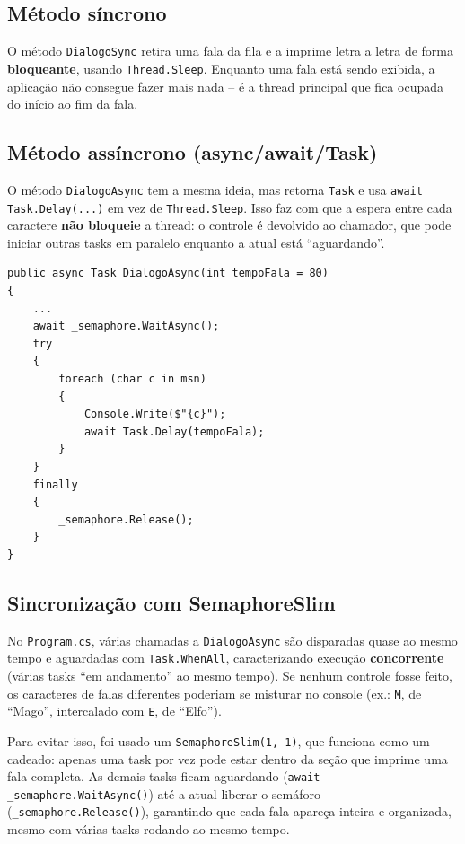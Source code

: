 \documentclass[12pt,a4paper]{article}
\begin{document}
\subsection{Método síncrono}

O método \texttt{DialogoSync} retira uma fala da fila e a imprime letra a letra de
forma \textbf{bloqueante}, usando \texttt{Thread.Sleep}. Enquanto uma fala está sendo
exibida, a aplicação não consegue fazer mais nada -- é a thread principal que fica
ocupada do início ao fim da fala.

\subsection{Método assíncrono (async/await/Task)}

O método \texttt{DialogoAsync} tem a mesma ideia, mas retorna \texttt{Task} e usa
\texttt{await Task.Delay(...)} em vez de \texttt{Thread.Sleep}. Isso faz com que a
espera entre cada caractere \textbf{não bloqueie} a thread: o controle é devolvido
ao chamador, que pode iniciar outras tasks em paralelo enquanto a atual está
``aguardando''.

\begin{lstlisting}
public async Task DialogoAsync(int tempoFala = 80)
{
    ...
    await _semaphore.WaitAsync();
    try
    {
        foreach (char c in msn)
        {
            Console.Write($"{c}");
            await Task.Delay(tempoFala);
        }
    }
    finally
    {
        _semaphore.Release();
    }
}
\end{lstlisting}

\subsection{Sincronização com SemaphoreSlim}

No \texttt{Program.cs}, várias chamadas a \texttt{DialogoAsync} são disparadas quase ao
mesmo tempo e aguardadas com \texttt{Task.WhenAll}, caracterizando execução
\textbf{concorrente} (várias tasks ``em andamento'' ao mesmo tempo). Se nenhum
controle fosse feito, os caracteres de falas diferentes poderiam se misturar no
console (ex.: \texttt{M}, de ``Mago'', intercalado com \texttt{E}, de ``Elfo'').

Para evitar isso, foi usado um \texttt{SemaphoreSlim(1, 1)}, que funciona como um
cadeado: apenas uma task por vez pode estar dentro da seção que imprime uma fala
completa. As demais tasks ficam aguardando (\texttt{await \_semaphore.WaitAsync()})
até a atual liberar o semáforo (\texttt{\_semaphore.Release()}), garantindo que cada
fala apareça inteira e organizada, mesmo com várias tasks rodando ao mesmo tempo.
\end{document}

